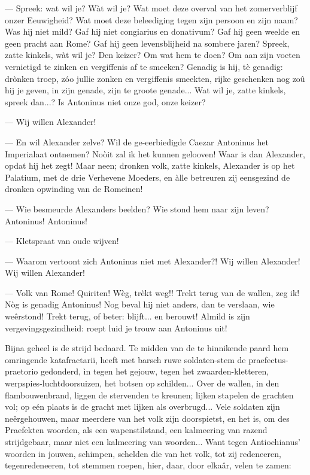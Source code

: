 \documentclass[a4paper, 12pt, oneside, dutch]{article}
\begin{document}
--- Spreek: wat wil je? Wàt wil je? Wat moet deze overval van het zomerverblijf onzer Eeuwigheid? Wat moet deze beleediging tegen zijn persoon en zijn naam? Was hij niet mild? Gaf hij niet congiarius en donativum? Gaf hij geen weelde en geen pracht aan Rome? Gaf hij geen levensblijheid na sombere jaren? Spreek, zatte kinkels, wàt wil je? Den keizer? Om wat hem te doen? Om aan zijn voeten vernietigd te zinken en vergiffenis af te smeeken? Genadig is hij, tè genadig: drònken troep, zóo jullie zonken en vergiffenis smeekten, rijke geschenken nog zoû hij je geven, in zijn genade, zijn te groote genade... Wat wil je, zatte kinkels, spreek dan...? Is Antoninus niet onze god, onze keizer?

--- Wij willen Alexander!

--- En wil Alexander zelve? Wil de ge-eerbiedigde Caezar Antoninus het Imperialaat ontnemen? Noòit zal ik het kunnen gelooven! Waar is dan Alexander, opdat hij het zegt! Maar neen; dronken volk, zatte kinkels, Alexander is op het Palatium, met de drie Verhevene Moeders, en àlle betreuren zij eensgezind de dronken opwinding van de Romeinen!

--- Wie besmeurde Alexanders beelden? Wie stond hem naar zijn leven? Antoninus! Antoninus!

--- Kletspraat van oude wijven!

--- Waarom vertoont zich Antoninus niet met Alexander?! Wij willen Alexander! Wij willen Alexander!

--- Volk van Rome! Quiriten! Wèg, trèkt weg!! Trekt terug van de wallen, zeg ik! Nòg is genadig Antoninus! Nog beval hij niet anders, dan te verslaan, wie weêrstond! Trekt terug, of beter: blijft... en berouwt! Almild is zijn vergevingsgezindheid: roept luid je trouw aan Antoninus uit!

Bijna geheel is de strijd bedaard. Te midden van de te hinnikende paard hem omringende katafractariï, heeft met barsch ruwe soldaten-stem de praefectus-praetorio gedonderd, ìn tegen het gejouw, tegen het zwaarden-kletteren, werpspies-luchtdoorsuizen, het botsen op schilden... Over de wallen, in den flambouwenbrand, liggen de stervenden te kreunen; lijken stapelen de grachten vol; op eén plaats is de gracht met lijken als overbrugd... Vele soldaten zijn neêrgehouwen, maar meerdere van het volk zijn doorspietst, en het is, om des Praefekten woorden, als een wapenstilstand, een kalmeering van razend strijdgebaar, maar niet een kalmeering van woorden... Want tegen Antiochianus' woorden in jouwen, schimpen, schelden die van het volk, tot zij redeneeren, tegenredeneeren, tot stemmen roepen, hier, daar, door elkaâr, velen te zamen:
\end{document}
